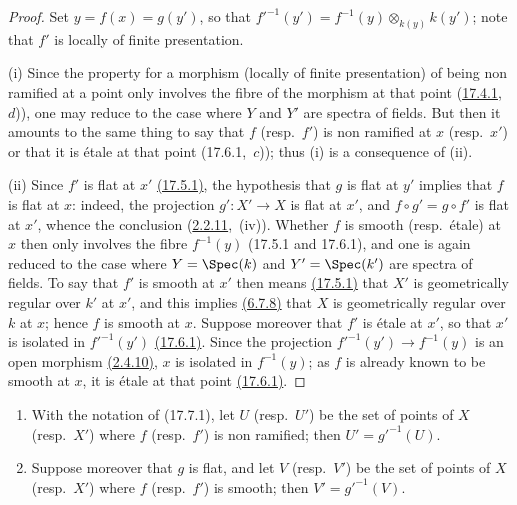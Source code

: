 \begin{proof}
Set $y=f(x)=g(y')$, so that $f'^{-1}(y')=f^{-1}(y)\otimes_{k(y)}k(y')$; note that $f'$ is locally of finite presentation.

(i) Since the property for a morphism (locally of finite presentation) of being non ramified at a point only involves the fibre of the morphism at that point ({\hyperlink{ega4.c04.thm.17-4-1}{17.4.1}},~$d$)), one may reduce to the case where $Y$ and $Y'$ are spectra of fields.
But then it amounts to the same thing to say that $f$ (resp.\ $f'$) is non ramified at $x$ (resp.\ $x'$) or that it is \'etale at that point (17.6.1,~$c$)); thus (i) is a consequence of (ii).

(ii) Since $f'$ is flat at $x'$ {\hyperlink{ega4.c04.thm.17-5-1}{(17.5.1)}}, the hypothesis that $g$ is flat at $y'$ implies that $f$ is flat at $x$: indeed, the projection $g':X'\to X$ is flat at $x'$, and $f\circ g'=g\circ f'$ is flat at $x'$, whence the conclusion ({\hyperlink{ega4.c04.cor.2-2-11}{2.2.11}},~(iv)).
Whether $f$ is smooth (resp.\ \'etale) at $x$ then only involves the fibre $f^{-1}(y)$ (17.5.1 and 17.6.1), and one is again reduced to the case where $Y=\Spec(k)$ and $Y'=\Spec(k')$ are spectra of fields.
To say that $f'$ is smooth at $x'$ then means {\hyperlink{ega4.c04.thm.17-5-1}{(17.5.1)}} that $X'$ is geometrically regular over $k'$ at $x'$, and this implies {\hyperlink{ega4.c04.cor.6-7-8}{(6.7.8)}} that $X$ is geometrically regular over $k$ at $x$; hence $f$ is smooth at $x$.
Suppose moreover that $f'$ is \'etale at $x'$, so that $x'$ is isolated in $f'^{-1}(y')$ {\hyperlink{ega4.c04.thm.17-6-1}{(17.6.1)}}.
Since the projection $f'^{-1}(y')\to f^{-1}(y)$ is an open morphism {\hyperlink{ega4.c04.cor.2-4-10}{(2.4.10)}}, $x$ is isolated in $f^{-1}(y)$; as $f$ is already known to be smooth at $x$, it is \'etale at that point {\hyperlink{ega4.c04.thm.17-6-1}{(17.6.1)}}.
\end{proof}

\begin{corollary}[17.7.2]
\label{IV.17.7.2}
\begin{enumerate}[label=(\roman*)]
  \item With the notation of (17.7.1), let $U$ (resp.\ $U'$) be the set of points of $X$ (resp.\ $X'$) where $f$ (resp.\ $f'$) is non ramified; then $U'=g'^{-1}(U)$.
  \item Suppose moreover that $g$ is flat, and let $V$ (resp.\ $V'$) be the set of points of $X$ (resp.\ $X'$) where $f$ (resp.\ $f'$) is smooth; then $V'=g'^{-1}(V)$.
\end{enumerate}
\end{corollary}


